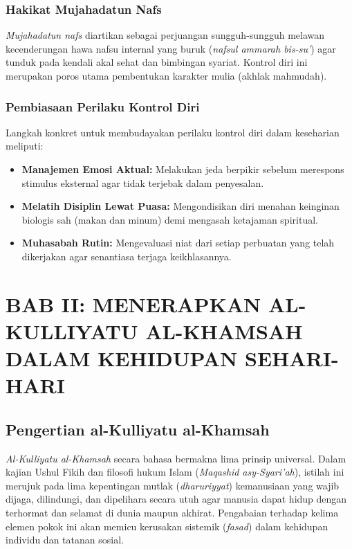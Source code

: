 \documentclass[12pt, a4paper]{article}
\begin{document}
\subsubsection{Hakikat Mujahadatun Nafs}
\textit{Mujahadatun nafs} diartikan sebagai perjuangan sungguh-sungguh melawan kecenderungan hawa nafsu internal yang buruk (\textit{nafsul ammarah bis-su'}) agar tunduk pada kendali akal sehat dan bimbingan syariat. Kontrol diri ini merupakan poros utama pembentukan karakter mulia (akhlak mahmudah).

\subsubsection{Pembiasaan Perilaku Kontrol Diri}
Langkah konkret untuk membudayakan perilaku kontrol diri dalam keseharian meliputi:
\begin{itemize}
    \item \textbf{Manajemen Emosi Aktual:} Melakukan jeda berpikir sebelum merespons stimulus eksternal agar tidak terjebak dalam penyesalan.
    \item \textbf{Melatih Disiplin Lewat Puasa:} Mengondisikan diri menahan keinginan biologis sah (makan dan minum) demi mengasah ketajaman spiritual.
    \item \textbf{Muhasabah Rutin:} Mengevaluasi niat dari setiap perbuatan yang telah dikerjakan agar senantiasa terjaga keikhlasannya.
\end{itemize}

\newpage

\section{BAB II: MENERAPKAN AL-KULLIYATU AL-KHAMSAH DALAM KEHIDUPAN SEHARI-HARI}

\subsection{Pengertian al-Kulliyatu al-Khamsah}
\textit{Al-Kulliyatu al-Khamsah} secara bahasa bermakna lima prinsip universal. Dalam kajian Ushul Fikih dan filosofi hukum Islam (\textit{Maqashid asy-Syari'ah}), istilah ini merujuk pada lima kepentingan mutlak (\textit{dharuriyyat}) kemanusiaan yang wajib dijaga, dilindungi, dan dipelihara secara utuh agar manusia dapat hidup dengan terhormat dan selamat di dunia maupun akhirat. Pengabaian terhadap kelima elemen pokok ini akan memicu kerusakan sistemik (\textit{fasad}) dalam kehidupan individu dan tatanan sosial.
\end{document}
